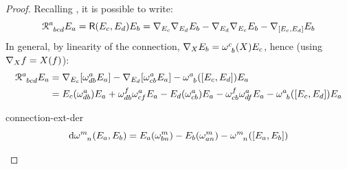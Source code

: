 \begin{proofbox}
  \begin{proof}
    Recalling , it is possible to write:
    \begin{equation*}
      \tensor{\rr}{^a_{bcd}} E_a = \riem(E_c , E_d) E_b = \na_{E_c} \na_{E_d} E_b - \na_{E_d} \na_{E_c} E_b - \na_{[E_c , E_d]} E_b
    \end{equation*}
    In general, by linearity of the connection, $ \na_X E_b = \tensor{\omega}{^c_b}(X) E_c $, hence (using $ \nabla_X f = X(f) $):
    \begin{equation*}
      \begin{split}
        \tensor{\rr}{^a_{bcd}} E_a
        & = \na_{E_c} [\omega^a_{db} E_a] - \na_{E_d} [\omega^a_{cb} E_a] - \tensor{\omega}{^a_b}([E_c , E_d]) E_a \\
        & = E_c(\omega^a_{db}) E_a + \omega^f_{db} \omega^a_{cf} E_a - E_d(\omega^a_{cb}) E_a - \omega^f_{cb} \omega^a_{df} E_a - \tensor{\omega}{^a_b}([E_c , E_d]) E_a \\
      \end{split}
    \end{equation*}

    \begin{lemma}[before upper = {\tcbtitle}]{}{connection-ext-der}
      \begin{equation}
        \dd \tensor{\omega}{^m_n}(E_a , E_b) = E_a(\omega^m_{bn}) - E_b(\omega^m_{an}) - \tensor{\omega}{^m_n}([E_a , E_b])
      \end{equation}
    \end{lemma}


\end{proof}
\end{proofbox}

